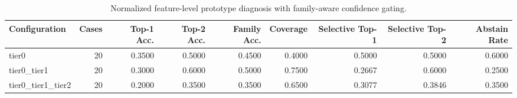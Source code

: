 \begin{table}[t]
\centering
\caption{Normalized feature-level prototype diagnosis with family-aware confidence gating.}
\label{tab:dice_stressor_hierarchical_diagnosis}
\footnotesize
\begin{tabular}{lrrrrrrrr}
\toprule
Configuration & Cases & Top-1 Acc. & Top-2 Acc. & Family Acc. & Coverage & Selective Top-1 & Selective Top-2 & Abstain Rate \\
\midrule
tier0 & 20 & 0.3500 & 0.5000 & 0.4500 & 0.4000 & 0.5000 & 0.5000 & 0.6000 \\
tier0_tier1 & 20 & 0.3000 & 0.6000 & 0.5000 & 0.7500 & 0.2667 & 0.6000 & 0.2500 \\
tier0_tier1_tier2 & 20 & 0.2000 & 0.3500 & 0.3500 & 0.6500 & 0.3077 & 0.3846 & 0.3500 \\
\bottomrule
\end{tabular}

\end{table}
